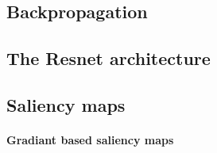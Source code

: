 \documentclass[11pt,a4paper]{article}
\begin{document}
\subsection{Backpropagation}

\subsection{The Resnet architecture}

\subsection{Saliency maps}

\paragraph{Gradiant based saliency maps} \label{sec:gradiant_saliency_maps}

\pagebreak


\printbibliography[title={Litterature}]
\end{document}
